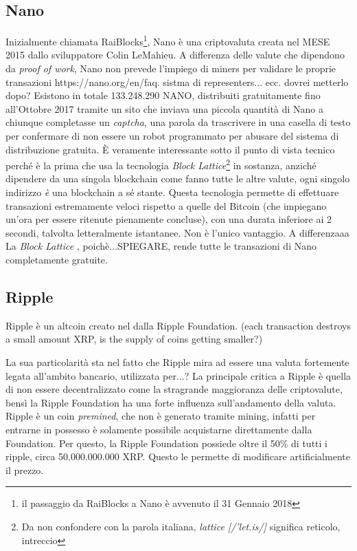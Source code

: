 \documentclass {article}
\begin{document}
{\subsection {Nano}


Inizialmente chiamata RaiBlocks\footnote{il passaggio da RaiBlocks a Nano è avvenuto il 31 Gennaio 2018}, Nano è una criptovaluta creata nel MESE 2015 dallo sviluppatore Colin LeMahieu.
A differenza delle valute che dipendono da \textit{proof of work}, Nano non prevede l'impiego di miners per validare le proprie transazioni https://nano.org/en/faq.
sistma di representers... ecc. dovrei metterlo dopo?
Esistono in totale 133.248.290 NANO, distribuiti gratuitamente fino all'Ottobre 2017 tramite un sito che inviava una piccola quantità di Nano a chiunque completasse un \textit{captcha}, una parola da trascrivere in una casella di testo per confermare di non essere un robot programmato per abusare del sistema di distribuzione gratuita.
È veramente interessante sotto il punto di vista tecnico perché è la prima che usa la tecnologia \textit{Block Lattice}\footnote{Da non confondere con la parola italiana, \textit{lattice [/'let.is/]} significa reticolo, intreccio} in sostanza, anziché dipendere da una singola blockchain come fanno tutte le altre valute, ogni singolo indirizzo \emph{è} una blockchain a sé stante.
Questa tecnologia permette di effettuare transazioni estremamente veloci rispetto a quelle del Bitcoin (che impiegano un'ora per essere ritenute pienamente concluse), con una durata inferiore ai 2 secondi, talvolta letteralmente istantanee.
Non è l'unico vantaggio. A differenzaaa
La \textit{Block Lattice} , poichè...SPIEGARE, rende tutte le transazioni di Nano completamente gratuite.


\subsection {Ripple}


Ripple è un altcoin creato nel dalla Ripple Foundation. (each transaction destroys a small amount XRP, is the supply of coins getting smaller?)

La sua particolarità sta nel fatto che Ripple mira ad essere una valuta fortemente legata all'ambito bancario, utilizzata per...?
La principale critica a Ripple è quella di non essere decentralizzato come la stragrande maggioranza delle criptovalute, bensì la Ripple Foundation ha una forte influenza sull'andamento della valuta.
Ripple è un coin \textit{premined}, che non è generato tramite mining, infatti per entrarne in possesso è solamente possibile acquistarne direttamente dalla Foundation.
Per questo, la Ripple Foundation possiede oltre il 50\% di tutti i ripple, circa 50.000.000.000 XRP. Questo le permette di modificare artificialmente il prezzo.


}
\end{document}
